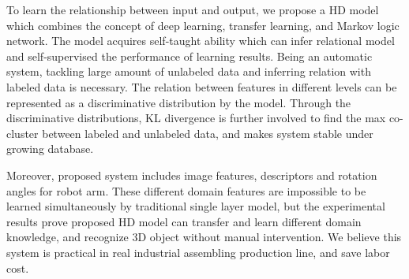 \documentclass{tADR2e}
\begin{document}
To learn the relationship between input and output, we propose a HD model which combines the concept of deep learning, transfer learning, and Markov logic network. The model acquires self-taught ability which can infer relational model and self-supervised the performance of learning results. Being an automatic system, tackling large amount of unlabeled data and inferring relation with labeled data is necessary. The relation between features in different levels can be represented as a discriminative distribution by the model. Through the discriminative distributions, KL divergence is further involved to find the max co-cluster between labeled and unlabeled data, and makes system stable under growing database. 

Moreover, proposed system includes image features, descriptors and rotation angles for robot arm. These different domain features are impossible to be learned simultaneously by traditional single layer model, but the experimental results prove proposed HD model can transfer and learn different domain knowledge, and recognize 3D object without manual intervention. We believe this system is practical in real industrial assembling production line, and save labor cost.
\end{document}

